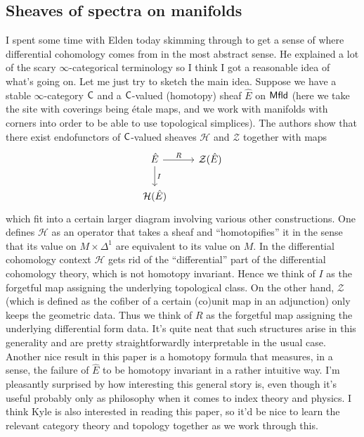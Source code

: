 \documentclass{amsart}
\begin{document}
\subsection{Sheaves of spectra on manifolds}
I spent some time with Elden today skimming through \cite{bnv} to get a sense of where
differential cohomology comes from in the most abstract sense. He explained a lot of the
scary $\infty$-categorical terminology so I think I got a reasonable idea of what's going
on. Let me just try to sketch the main idea. Suppose we have a stable $\infty$-category
$\sf C$ and a $\sf C$-valued (homotopy) sheaf $\hat E$ on $\sf Mfld$ (here we take
the site with coverings being \'etale maps, and we work with manifolds with corners
into order to be able to use topological simplices). The authors show that there exist
endofunctors of $\sf C$-valued sheaves $\mathcal{H}$ and $\mathcal{Z}$ together with maps
\begin{equation*}
    \begin{tikzcd}
        \hat E \rar{R}\dar{I} & \mathcal{Z}(\hat E)\\
        \mathcal{H}(\hat E)
    \end{tikzcd}
\end{equation*}
which fit into a certain larger diagram involving various other constructions. One
defines $\mathcal{H}$ as an operator that takes a sheaf and ``homotopifies'' it
in the sense that its value on $M\times\Delta^1$ are equivalent to its value on $M$.
In the differential cohomology context $\mathcal{H}$ gets rid of the ``differential''
part of the differential cohomology theory, which is not homotopy invariant. Hence
we think of $I$ as the forgetful map assigning the underlying topological class.
On the other hand, $\mathcal{Z}$ (which is defined as the cofiber of a certain (co)unit
map in an adjunction) only keeps the geometric data. Thus we think of $R$ as the forgetful
map assigning the underlying differential form data. It's quite neat that such
structures arise in this generality and are pretty straightforwardly interpretable in
the usual case. Another nice result in this paper is a homotopy formula that
measures, in a sense, the failure of $\hat E$ to be homotopy invariant in a rather
intuitive way. I'm pleasantly surprised by how interesting this general story is, even though
it's useful probably only as philosophy when it comes to index theory and physics.
I think Kyle is also interested in reading this paper, so it'd be nice to learn the
relevant category theory and topology together as we work through this.
\end{document}
